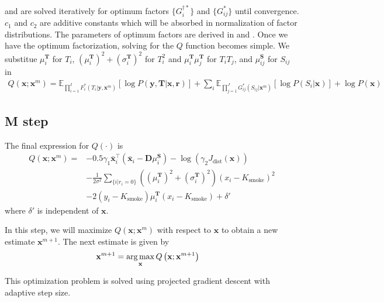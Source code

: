  and  are solved iteratively for optimum factors $ \lbrace G^{\dagger*}_i \rbrace $ and $ \lbrace G_{ij}^* \rbrace $ until convergence. $c_1$ and $c_2$ are additive constants which will be absorbed in normalization of factor distributions. The parameters of optimum factors are derived in  and .  Once we have the optimum factorization, solving for the $Q$ function becomes simple. We substitue $\mu^\mathbf{T}_i$ for $T_i$, $\left( \mu^\mathbf{T}_i \right)^2 + \left( \sigma^\mathbf{T}_i \right)^2$ for $T_i^2$ and $\mu^\mathbf{T}_i \mu^\mathbf{T}_j $ for $T_i T_j$, and $\mu^\mathbf{S}_{ij}$ for $S_{ij}$ in
\begin{align}
Q(\mathbf{x}; \mathbf{x}^m) = \mathbb{E}_{ \prod_{i=1}^{I} F^*_i (T_i | \mathbf{y}, \mathbf{x}^m) } \left[ \log P \left( \mathbf{y}, \mathbf{T} | \mathbf{x}, \mathbf{r} \right) \right] + \sum_i \mathbb{E}_{ \prod_{j=1}^{J} G^*_{ij} \left( S_{ij} | \mathbf{x}^m \right) } \left[ \log P \left( S_i | \mathbf{x} \right) \right] + \log P \left( \mathbf{x} \right)
\end{align}


\subsection{M step}
The final expression for $Q \left( \cdot \right)$ is
\begin{equation}
\begin{split}
Q\left( \mathbf{x}; \mathbf{x}^m \right) =  &-0.5 \gamma_1 \mathbf{\bar{x}}^\intercal_i \left( \mathbf{\bar{x}}_i -  \mathbf{D} \mu^\mathbf{S}_i \right) - \log \left( \gamma_2 J_\text{dist}\left( \mathbf{x} \right) \right) \\
&- \frac{1}{2 \sigma^2} \sum_{\{i | r_i = 0 \}}  \left(
\left(\mu^\mathbf{T}_i\right)^2 + \left(\sigma^\mathbf{T}_i\right)^2\right) \left(x_i - K_\text{smoke}\right)^2 \\
&- 2 \left(y_i - K_\text{smoke}\right) \mu^\mathbf{T}_i \left(x_i - K_\text{smoke} \right) + \delta'
\end{split}
\end{equation}
where $\delta'$ is independent of $\mathbf{x}$.

In this step, we will maximize $Q(\mathbf{x}; \mathbf{x}^m)$ with respect to $\mathbf{x}$ to obtain a new estimate $\mathbf{x}^{m+1}$. The next estimate is given by
\begin{align}
    \mathbf{x}^{m+1} &= \operatorname*{arg\,max}_{\mathbf{x}} Q \left( \mathbf{x}; \mathbf{x}^{m+1} \right) \label{eqn:mStep}
\end{align}

This optimization problem is solved using projected gradient descent with adaptive step size.



